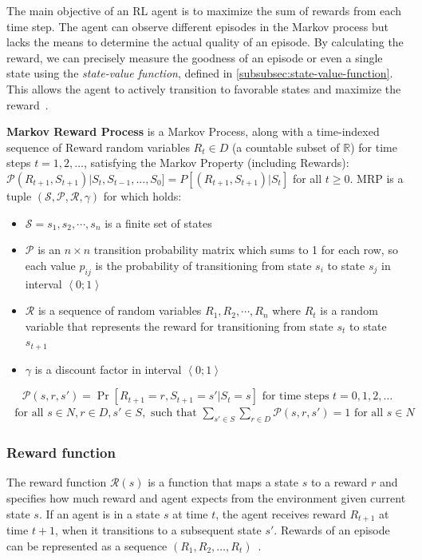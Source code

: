 \documentclass[../xlapes02]{subfiles}
\begin{document}
    The main objective of an RL agent is to maximize the sum of rewards from each time step. The agent can observe different episodes in the Markov process but lacks the means to determine the actual quality of an episode. By calculating the reward, we can precisely measure the goodness of an episode or even a single state using the \emph{state-value function}, defined in \cref{subsubsec:state-value-function}. This allows the agent to actively transition to favorable states and maximize the reward~\cite{rao2022foundations}.

    \begin{definition}
        \textbf{Markov Reward Process} is a Markov Process, along with a time-indexed sequence of Reward random variables $R_t \in D$ (a countable subset of $\mathbb{R}$) for time steps $t = 1, 2, \ldots$, satisfying the Markov Property (including Rewards): $\mathcal{P}(R_{t+1},S_{t+1})|S_t,S_{t-1}, \ldots, S_0] = P[(R_{t+1}, S_{t+1})|S_t]$ for all $t \geq 0$. MRP is a tuple $(\mathcal{S},\mathcal{P},\mathcal{R},\gamma)$ for which holds:\cite{rao2022foundations}
        \begin{itemize}
            \item $\mathcal{S}=s_1,s_2,\cdots,s_n$ is a finite set of states
            \item $\mathcal{P}$ is an $n\times n$ transition probability matrix which sums to 1 for each row, so each value $p_{ij}$ is the probability of transitioning from state $s_i$ to state $s_j$ in interval $\left< 0;1 \right>$
            \item $\mathcal{R}$ is a sequence of random variables $R_1,R_2,\cdots,R_n$ where $R_t$ is a random variable that represents the reward for transitioning from state $s_t$ to state $s_{t+1}$
            \item $\gamma$ is a discount factor in interval $\left<0;1\right>$
        \end{itemize}
        \begin{equation}
            \mathcal{P}(s,r,s')=\Pr\left[R_{t+1}=r,S_{t+1}=s'|S_t=s\right]\text{ for time steps }t=0,1,2,\ldots
        \end{equation}
        \begin{align*}
            \text{ for all }s\in N,r\in D,s'\in S,\text{ such that }\sum_{s'\in S}\sum_{r\in D}\mathcal{P}(s,r,s')=1\text{ for all }s\in N
        \end{align*}
    \end{definition}

    \subsubsection{Reward function}\label{par:reward-function}
    The reward function $\mathcal{R}(s)$ is a function that maps a state $s$ to a reward $r$ and specifies how much reward and agent expects from the environment given current state $s$. If an agent is in a state $s$ at time $t$, the agent receives reward  $R_{t+1}$  at time $t + 1$,  when it transitions to a subsequent state $s'$. Rewards of an episode can be represented as a sequence $(R_1, R_2, \ldots, R_t)$~\cite{FITMT25127}.
\end{document}
